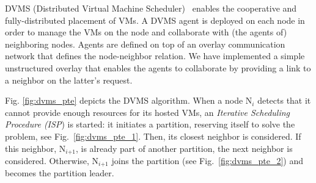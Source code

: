 DVMS (Distributed Virtual Machine Scheduler)~\cite{quesnel:cpe2012} enables the
cooperative and fully-distributed placement of
VMs. A DVMS agent is deployed on each node in order to manage the VMs on
the node and collaborate with (the agents of) neighboring nodes.
Agents are defined on top of an overlay communication network that
defines the node-neighbor relation.
We have implemented a simple %
unstructured overlay that enables the agents to collaborate
by providing a link to a neighbor %
on the latter's request.





Fig. \ref{fig:dvms_pte} depicts the DVMS algorithm.
When a node N\(_{\textit{i}}\) detects that it cannot provide enough
resources for its hosted VMs, %
an \emph{Iterative Scheduling Procedure
  (ISP}) is started:
%
it initiates a partition, reserving itself to solve the problem, see
Fig.~\ref{fig:dvms_pte_1}.  Then, its closest
neighbor %
is considered.
%
%
%
If this neighbor, N\(_{\textit{i+1}}\),
is already part of another partition, the next neighbor is considered.
Otherwise, N\(_{\textit{i+1}}\)
joins the partition (see Fig.~\ref{fig:dvms_pte_2}) and becomes the
partition leader.
%

